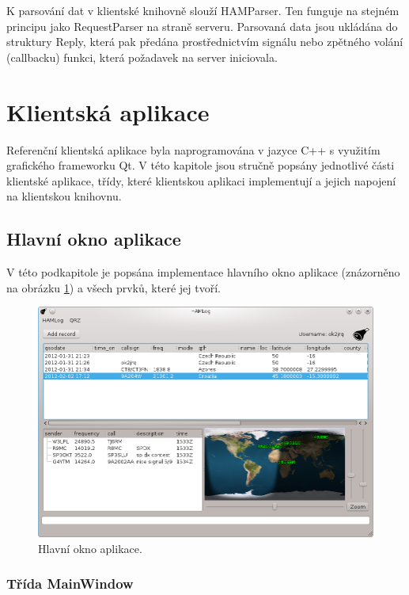 K parsování dat v klientské knihovně slouží HAMParser. Ten funguje na stejném principu jako RequestParser na straně serveru.
Parsovaná data jsou ukládána do struktury Reply, která pak předána prostřednictvím signálu nebo zpětného volání (callbacku)
funkci, která požadavek na server iniciovala.

\section{Klientská aplikace}
\label{implementace_klient}

Referenční klientská aplikace byla naprogramována v jazyce C++ s využitím grafického frameworku Qt. V této kapitole jsou stručně
popsány jednotlivé části klientské aplikace, třídy, které klientskou aplikaci implementují a jejich napojení na klientskou knihovnu.

\subsection{Hlavní okno aplikace}

V této podkapitole je popsána implementace hlavního okno aplikace (znázorněno na obrázku \ref{fig:okno}) a všech prvků, které jej tvoří.

\begin{figure}[h]
\centering
\includegraphics[trim=0cm 0cm 0cm 0cm, scale=0.7]{fig/ham3}
\caption{Hlavní okno aplikace.}
\label{fig:okno}
\end{figure}

\subsubsection{Třída MainWindow}

